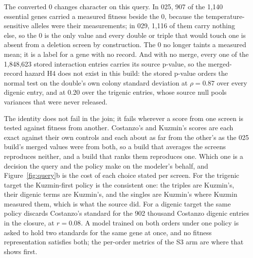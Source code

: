 The converted 0 changes character on this query. In 025, 907 of the 1{,}140 essential
genes carried a measured fitness beside the 0, because the temperature-sensitive
alleles were their measurements; in 029, 1{,}116 of them carry nothing else, so the 0
is the only value and every double or triple that would touch one is absent from a
deletion screen by construction. The 0 no longer taints a measured mean; it is a label
for a gene with no record. And with no merge, every one of the 1{,}848{,}623 stored
interaction entries carries its source p-value, so the merged-record hazard H4 does
not exist in this build: the stored p-value orders the normal test on the double's own
colony standard deviation at $\rho = 0.87$ over every digenic entry, and at 0.20 over
the trigenic entries, whose source null pools variances that were never released.

\begin{table}[H]
\centering
\footnotesize
\caption{The identity under each label policy. The stored score is the source's; the
recomputed score uses the policy's fitness for every term. Bold: the highest $r$ per
order. Generated by \texttt{closure\_recompute.py}.}
\label{tab:query-comparison}

\end{table}


The identity does not fail in the join; it fails wherever a score from one screen is
tested against fitness from another. Costanzo's and Kuzmin's scores are each exact
against their own controls and each about as far from the other's as the 025 build's
merged values were from both, so a build that averages the screens reproduces neither,
and a build that ranks them reproduces one. Which one is a decision the query and the
policy make on the modeler's behalf, and Figure~\ref{fig:query}b is the cost of each
choice stated per screen. For the trigenic target the Kuzmin-first policy is the
consistent one: the triples are Kuzmin's, their digenic terms are Kuzmin's, and the
singles are Kuzmin's where Kuzmin measured them, which is what the source did. For a
digenic target the same policy discards Costanzo's standard for the 902 thousand
Costanzo digenic entries in the closure, at $r = 0.08$. A model trained on both orders under one
policy is asked to hold two standards for the same gene at once, and no fitness
representation satisfies both; the per-order metrics of the S3 arm are where that
shows first.

